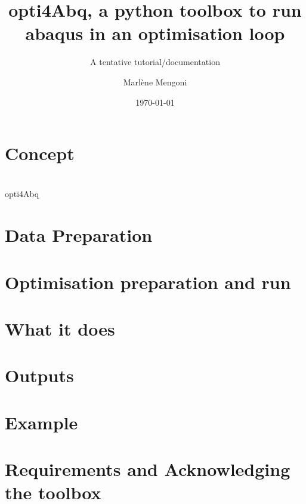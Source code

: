 \documentclass[t]{beamer}
\title[opti4Abq - A tentative tutorial/documentation]{opti4Abq, a python toolbox to run abaqus in an optimisation loop}
\subtitle{A tentative tutorial/documentation}
\date{\today}
\author{Marl\`ene Mengoni}
\institute[IMBE]{
	\href{mailto:m.mengoni@leeds.ac.uk}{m.mengoni@leeds.ac.uk}\\
}
\begin{document}
\titleframe

\section[Background]{Concept}


\section[]{}
\begin{frame}{opti4Abq}%
  \myToc
\end{frame}
\section{Data Preparation}



\section[Optimisation process]{Optimisation preparation and run}




\section{What it does}


\section{Outputs}


\section{Example}

\section[Citation]{Requirements and Acknowledging the toolbox}




\end{document}
